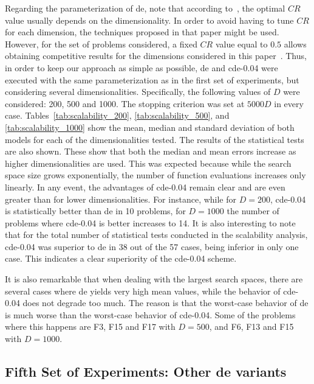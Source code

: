 \documentclass[preprint,3p]{elsarticle}
\newcommand{\CDE}{c{\sc de}}
\newcommand{\DE}{{\sc de}}
\begin{document}
Regarding the parameterization of \DE{}, note that according to~\cite{Zhao:13}, the optimal $CR$ value usually depends on the dimensionality.
%
In order to avoid having to tune $CR$ for each dimension, the techniques proposed in that paper might be used.
%
However, for the set of problems considered, a fixed $CR$ value equal to $0.5$ allows obtaining competitive results
for the dimensions considered in this paper~\cite{LaTorre:11}.
%
Thus, in order to keep our approach as simple as possible,
\DE{} and \CDE{}-0.04 were executed with
the same parameterization as in the first set of experiments,
but considering several dimensionalities.
%
Specifically, the following values of $D$ were considered: 200, 500 and 1000.
%
The stopping criterion was set at $5000D$ in every case.
%
Tables~\ref{tab:scalability_200}, \ref{tab:scalability_500},
and \ref{tab:scalability_1000} show the mean, median and standard deviation
of both models for each of the dimensionalities tested.
%
The results of the statistical tests are also shown.
%
These show that both the median and mean errors increase as higher dimensionalities are used.
%
This was expected because while the search space size grows exponentially, the number of function evaluations increases only linearly.
%
In any event, the advantages of \CDE{}-0.04 remain clear and are even greater than for lower dimensionalities.
%
For instance, while for $D = 200$, \CDE{}-0.04 is statistically better than \DE{} in
10 problems, for $D = 1000$ the number of problems where \CDE{}-0.04 is better increases to 14.
%
It is also interesting to note that for the total number of statistical tests conducted in
the scalability analysis, \CDE{}-0.04 was superior to \DE{} in 38 out of the 57 cases, being inferior in only one case.
%
This indicates a clear superiority of the \CDE{}-0.04 scheme.

It is also remarkable that when dealing with the largest search spaces,
there are several cases where \DE{} yields very high mean values, while the behavior of
\CDE{}-0.04 does not degrade too much.
%
The reason is that the worst-case behavior of \DE{} is much worse than the worst-case behavior of \CDE{}-0.04.
%
Some of the problems where this happens are F3, F15 and F17 with $D = 500$, and F6, F13 and F15 with $D = 1000$.

\subsection{Fifth Set of Experiments: Other \DE{} variants}
\end{document}
